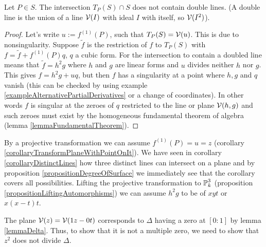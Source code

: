 \begin{lemma}
Let $P \in S$. The intersection $T_P(S) \cap S$ does not contain double lines.
(A double line is the union of a line $\operatorname{\mathcal V}(I)$ with ideal $I$ with itself, so $\operatorname{\mathcal V}(I^2)$).
\end{lemma}
\begin{proof}

Let's write $u := f^{(1)}(P)$, such that $T_P(S) = \operatorname{\mathcal V}(u)$.
This is due to nonsingularity. Suppose $\widetilde f$ is the restriction of $f$ to $T_P(S)$ with $f = \widetilde f + f^{(1)}(P)q$, $q$ a cubic form.
For the intersection to contain a doubled line means that $\widetilde f = h^2g$ where $h$ and $g$ are linear forms and $u$ divides neither $h$ nor $g$.
This gives $f = h^2g + uq$, but then $f$ has a singularity at a point where $h,g$ and $q$ vanish (this can be checked by using example \ref{exampleAlternativePartialDerivatives} or a change of coordinates).
In other words $f$ is singular at the zeroes of $q$ restricted to the line or plane $\operatorname{\mathcal V}(h,g)$ and such zeroes must exist by the homogeneous fundamental theorem of algebra (lemma \ref{lemmaFundamentalTheorem}).
\end{proof}

By a projective transformation we can assume $f^{(1)}(P) = u = z$ (corollary \ref{corollaryTransformPlaneWithPointOnIt}).
We have seen in corollary \ref{corollaryDistinctLines} how three distinct lines can intersect on a plane and by proposition \ref{propositionDegreeOfSurface} we immediately see that the corollary covers all possibilities.
Lifting the projective transformation to $\operatorname{\mathbb P}^3_k$ (proposition \ref{propositionLiftingAutomorphisms}) we can assume $h^2g$ to be of $xyt$ or $x(x-t)t$.

The plane $\operatorname{\mathcal V}(z) = \operatorname{\mathcal V}(1z- 0t)$ corresponds to $\Delta$ having a zero at $[0:1]$ by lemma \ref{lemmaDelta}.
Thus, to show that it is not a multiple zero, we need to show that $z^2$ does not divide $\Delta$.

